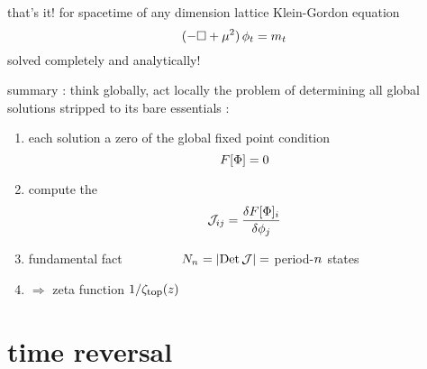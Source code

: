 \begin{frame}{that's it! for spacetime of {\color{blue}any} dimension}
lattice Klein-Gordon equation
    {\Huge
\[
  (-\Box + {\mu}^2)\,\phi_{t} = m_t
\] %
    }
\hfill solved completely and analytically!
\end{frame} %


\begin{frame}{summary : think globally, act locally}
\bigskip
the problem of determining all global solutions stripped
to its bare essentials :
\bigskip
\begin{enumerate}
              \item
each solution a zero of the global {\color{blue}fixed point} condition
\[
F[\Phi] = 0
\]
              \item
compute  the {\jacobianOrb}
\[
{\cal J}_{ij} =\frac{\delta F[\Phi]_i}{\delta \phi_j}
\]
              \item
{\color{blue}fundamental fact} ~~~~~~~~
\(
N_{n_{}} = |\mbox{\rm Det}\,{\cal J}| =
\)
 period-${n_{}}$ states

 \bigskip
              \item
\hfill $\Rightarrow$ {\color{blue}zeta function} $1/\zeta_{\mbox{\footnotesize top}} (z)$
            \end{enumerate}
\end{frame} %




\section[time reversal]
 {time reversal}
\label{s:refersal}


%


